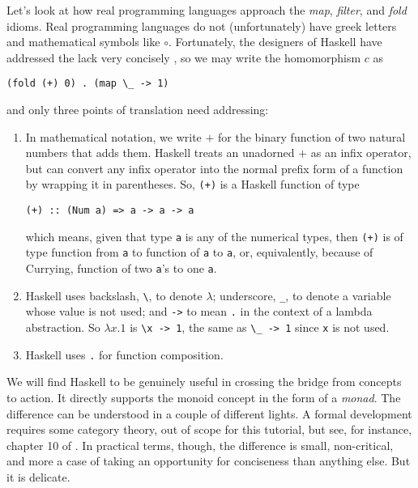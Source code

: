 Let's look at how real programming languages approach the \emph{map}, \emph{filter}, and \emph{fold} idioms. Real programming languages do not (unfortunately) have greek letters and mathematical symbols like $\circ$.
Fortunately, the designers of Haskell have addressed the lack very concisely \cite{haskellsite}, so we may write the homomorphism $c$ as
\begin{center}
  \verb"(fold (+) 0) . (map \_ -> 1)"
\end{center}
and only three points of translation need addressing:
\begin{enumerate}
	\item In mathematical notation, we write $+$ for the binary function of two natural numbers that adds them. Haskell treats an unadorned $+$ as an infix operator, but can convert any infix operator into the normal prefix form of a function by wrapping it in parentheses. So, \verb"(+)" is a Haskell function of type
\begin{center}
  \verb"(+) :: (Num a) => a -> a -> a"
\end{center}
which means, given that type \verb"a" is any of the numerical types, then \verb"(+)" is of type function from \verb"a" to function of \verb"a" to \verb"a", or, equivalently, because of Currying, function of two \verb"a"'s to one \verb"a". 

  \item Haskell uses backslash, \verb"\", to denote $\lambda$; underscore, \verb"_", to denote a variable whose value is not used; and \verb"->" to mean \verb"." in the context of a lambda abstraction. So $\lambda x.1$ is \verb"\x -> 1", the same as \verb"\_ -> 1" since \verb"x" is not used.

  \item Haskell uses \verb"." for function composition.
\end{enumerate}


We will find Haskell to be genuinely useful in crossing the bridge from concepts to action. It directly supports the monoid concept in the form of a \emph{monad}. The difference can be understood in a couple of different lights. A formal development requires some category theory, out of scope for this tutorial, but see, for instance, chapter 10 of \cite{arrows}. In practical terms, though, the difference is small, non-critical, and more a case of taking an opportunity for conciseness than anything else. But it is delicate. 


